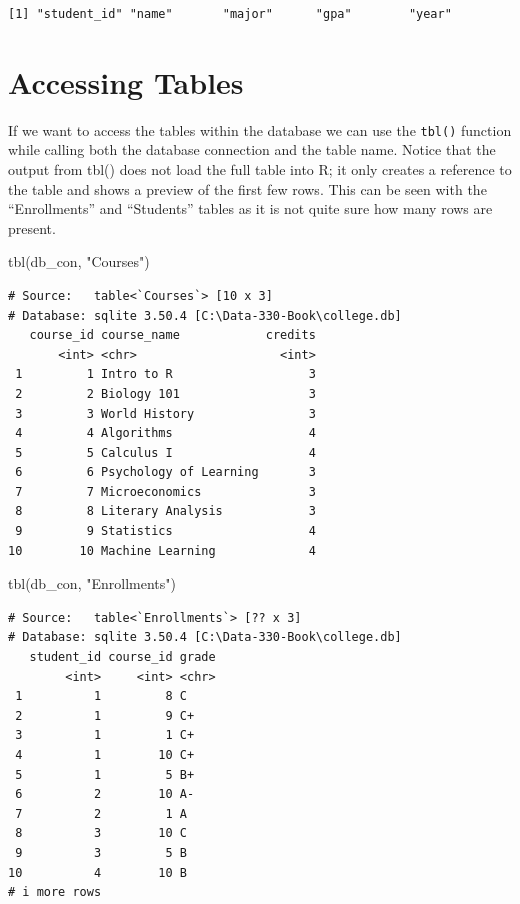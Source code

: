 \documentclass[
  letterpaper,
  DIV=11,
  numbers=noendperiod]{scrreprt}
\newenvironment{Shaded}{\begin{snugshade}}{\end{snugshade}}
\newcommand{\FunctionTok}[1]{\textcolor[rgb]{0.28,0.35,0.67}{#1}}
\newcommand{\NormalTok}[1]{\textcolor[rgb]{0.00,0.23,0.31}{#1}}
\newcommand{\StringTok}[1]{\textcolor[rgb]{0.13,0.47,0.30}{#1}}
\begin{document}
\begin{verbatim}
[1] "student_id" "name"       "major"      "gpa"        "year"      
\end{verbatim}

\section{Accessing Tables}\label{accessing-tables}

If we want to access the tables within the database we can use the
\texttt{tbl()} function while calling both the database connection and
the table name. Notice that the output from tbl() does not load the full
table into R; it only creates a reference to the table and shows a
preview of the first few rows. This can be seen with the ``Enrollments''
and ``Students'' tables as it is not quite sure how many rows are
present.

\begin{Shaded}
\begin{Highlighting}[]
\FunctionTok{tbl}\NormalTok{(db\_con, }\StringTok{"Courses"}\NormalTok{)}
\end{Highlighting}
\end{Shaded}

\begin{verbatim}
# Source:   table<`Courses`> [10 x 3]
# Database: sqlite 3.50.4 [C:\Data-330-Book\college.db]
   course_id course_name            credits
       <int> <chr>                    <int>
 1         1 Intro to R                   3
 2         2 Biology 101                  3
 3         3 World History                3
 4         4 Algorithms                   4
 5         5 Calculus I                   4
 6         6 Psychology of Learning       3
 7         7 Microeconomics               3
 8         8 Literary Analysis            3
 9         9 Statistics                   4
10        10 Machine Learning             4
\end{verbatim}

\begin{Shaded}
\begin{Highlighting}[]
\FunctionTok{tbl}\NormalTok{(db\_con, }\StringTok{"Enrollments"}\NormalTok{)}
\end{Highlighting}
\end{Shaded}

\begin{verbatim}
# Source:   table<`Enrollments`> [?? x 3]
# Database: sqlite 3.50.4 [C:\Data-330-Book\college.db]
   student_id course_id grade
        <int>     <int> <chr>
 1          1         8 C    
 2          1         9 C+   
 3          1         1 C+   
 4          1        10 C+   
 5          1         5 B+   
 6          2        10 A-   
 7          2         1 A    
 8          3        10 C    
 9          3         5 B    
10          4        10 B    
# i more rows
\end{verbatim}
\end{document}
